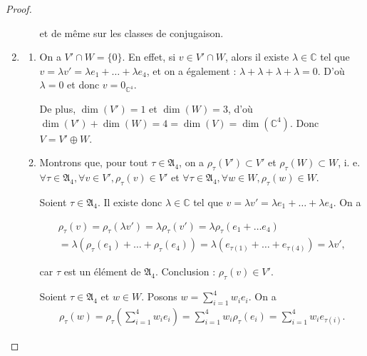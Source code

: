 \documentclass[french]{book}
\theoremstyle{definition}
\theoremstyle{remark}
\begin{document}
\begin{proof}
\begin{enumerate}
\begin{enumerate}
      et de même sur les classes de conjugaison.
    \end{enumerate}
    \item \begin{enumerate}
      \item On a \(V' \cap W = \{ 0 \}\). En effet, si \(v \in V' \cap W\), alors il existe \(\lambda \in \mathbb{C}\) tel que \(v = \lambda v' = \lambda e_1 + \dots + \lambda e_4\), et on a également : \(\lambda + \lambda + \lambda + \lambda = 0\). D'où \(\lambda = 0\) et donc \(v = 0 _{\mathbb{C}^{4}}\).

      De plus, \(\operatorname{dim}(V') = 1\) et \(\operatorname{dim}(W)=3\), d'où \(\operatorname{dim}(V')+ \operatorname{dim}(W) = 4 = \operatorname{dim}(V) =\operatorname{dim}(\mathbb{C} ^{4})\). Donc \(V = V' \oplus W\).
      \item Montrons que, pour tout \(\tau \in \mathfrak{A}_{4}\), on a \(\rho _{\tau}(V')\subset V'\) et \(\rho _{\tau}(W) \subset W\), i. e. \(\forall \tau \in \mathfrak{A}_{4}, \forall v \in V', \rho _{\tau}(v) \in V'\) et \(\forall \tau \in \mathfrak{A}_{4}, \forall w \in W, \rho _{\tau}(w) \in W\).

      Soient \(\tau \in \mathfrak{A}_{4}\). Il existe donc \(\lambda \in \mathbb{C}\) tel que \(v =  \lambda v' = \lambda e_1 + \dots + \lambda e_4\). On a

      \begin{gather*}
        \rho _{\tau}(v) = \rho _{\tau}(\lambda v') = \lambda \rho _{\tau}(v') = \lambda \rho _{\tau}(e_1 + \dots e_4) \\
        = \lambda(\rho _{\tau}(e_1) + \dots + \rho _{\tau}(e_4)) = \lambda (e _{\tau(1)} + \dots + e _{\tau(4)}) = \lambda v',
      \end{gather*}

      car \(\tau\) est un élément de \(\mathfrak{A}_{4}\). Conclusion : \(\rho _{\tau}(v) \in V'\).

      Soient \(\tau \in \mathfrak{A}_{4}\) et \(w \in W\). Posons \(w = \displaystyle\sum_{i=1}^{4} w_i e_i \). On a
      \begin{gather*}
        \rho _{\tau}(w) = \rho _{\tau}\left(\sum_{i=1}^{4} w_i e_i \right) = \sum_{i=1}^{4} w_i \rho _{\tau}(e_i) = \sum_{i=1}^{4} w_i e _{\tau(i)}.
      \end{gather*}


\end{enumerate}
\end{enumerate}
\end{proof}
\end{document}
